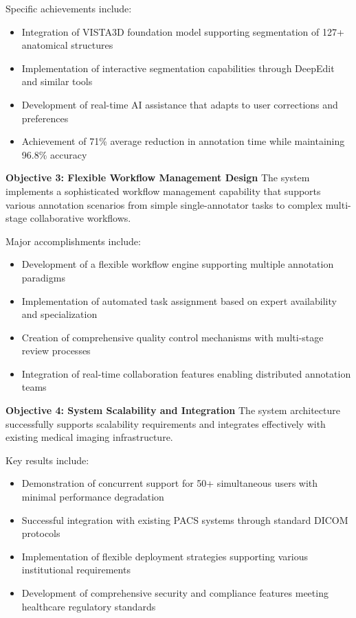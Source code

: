 Specific achievements include:
\begin{itemize}
    \item Integration of VISTA3D foundation model supporting segmentation of 127+ anatomical structures
    \item Implementation of interactive segmentation capabilities through DeepEdit and similar tools
    \item Development of real-time AI assistance that adapts to user corrections and preferences
    \item Achievement of 71\% average reduction in annotation time while maintaining 96.8\% accuracy
\end{itemize}

\textbf{Objective 3: Flexible Workflow Management Design}
The system implements a sophisticated workflow management capability that supports various annotation scenarios from simple single-annotator tasks to complex multi-stage collaborative workflows.

Major accomplishments include:
\begin{itemize}
    \item Development of a flexible workflow engine supporting multiple annotation paradigms
    \item Implementation of automated task assignment based on expert availability and specialization
    \item Creation of comprehensive quality control mechanisms with multi-stage review processes
    \item Integration of real-time collaboration features enabling distributed annotation teams
\end{itemize}

\textbf{Objective 4: System Scalability and Integration}
The system architecture successfully supports scalability requirements and integrates effectively with existing medical imaging infrastructure.

Key results include:
\begin{itemize}
    \item Demonstration of concurrent support for 50+ simultaneous users with minimal performance degradation
    \item Successful integration with existing PACS systems through standard DICOM protocols
    \item Implementation of flexible deployment strategies supporting various institutional requirements
    \item Development of comprehensive security and compliance features meeting healthcare regulatory standards
\end{itemize}

